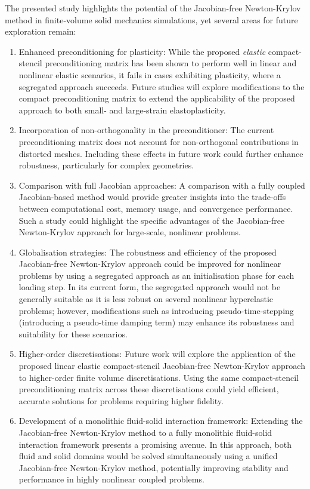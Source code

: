 \documentclass[sn-mathphys,Numbered]{sn-jnl}%
\begin{document}
The presented study highlights the potential of the Jacobian-free Newton-Krylov method in finite-volume solid mechanics simulations, yet several areas for future exploration remain:
\begin{enumerate}
	\item{Enhanced preconditioning for plasticity}: While the proposed \emph{elastic} compact-stencil preconditioning matrix has been shown to perform well in linear and nonlinear elastic scenarios, it fails in cases exhibiting plasticity, where a segregated approach succeeds. Future studies will explore modifications to the compact preconditioning matrix to extend the applicability of the proposed approach to both small- and large-strain elastoplasticity.

	\item{Incorporation of non-orthogonality in the preconditioner}: The current preconditioning matrix does not account for non-orthogonal contributions in distorted meshes. Including these effects in future work could further enhance robustness, particularly for complex geometries.

	\item{Comparison with full Jacobian approaches}: A comparison with a fully coupled Jacobian-based method would provide greater insights into the trade-offs between computational cost, memory usage, and convergence performance. Such a study could highlight the specific advantages of the Jacobian-free Newton-Krylov approach for large-scale, nonlinear problems.

	\item{Globalisation strategies}: The robustness and efficiency of the proposed Jacobian-free Newton-Krylov approach could be improved for nonlinear problems by using a segregated approach as an initialisation phase for each loading step. In its current form, the segregated approach would not be generally suitable as it is less robust on several nonlinear hyperelastic problems; however, modifications such as introducing pseudo-time-stepping (introducing a pseudo-time damping term) may enhance its robustness and suitability for these scenarios.

	\item{Higher-order discretisations}: Future work will explore the application of the proposed linear elastic compact-stencil Jacobian-free Newton-Krylov approach to higher-order finite volume discretisations. Using the same compact-stencil preconditioning matrix across these discretisations could yield efficient, accurate solutions for problems requiring higher fidelity.

	\item{Development of a monolithic fluid-solid interaction framework}: Extending the Jacobian-free Newton-Krylov method to a fully monolithic fluid-solid interaction framework presents a promising avenue. In this approach, both fluid and solid domains would be solved simultaneously using a unified Jacobian-free Newton-Krylov method, potentially improving stability and performance in highly nonlinear coupled problems.
\end{enumerate}
\end{document}

